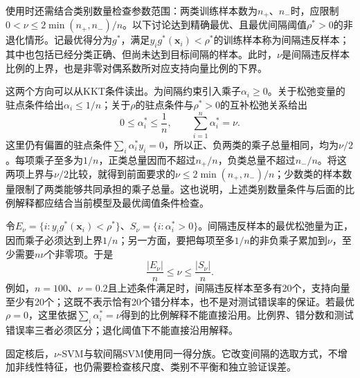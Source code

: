 使用时还需结合类别数量检查参数范围：两类训练样本数为$n_+$、$n_-$时，应限制$0<\nu\leq2\min(n_+,n_-)/n$。以下讨论达到精确最优、且最优间隔阈值$\rho^\ast>0$的非退化情形。记最优得分为$g^\ast$，满足$y_i g^\ast(\bm{x}_i)<\rho^\ast$的训练样本称为间隔违反样本；其中也包括已经分类正确、但尚未达到目标间隔的样本。此时，$\nu$是间隔违反样本比例的上界，也是非零对偶系数所对应支持向量比例的下界。

这两个方向可以从KKT条件读出。为间隔约束引入乘子$\alpha_i\geq0$。关于松弛变量的驻点条件给出$\alpha_i\leq1/n$；关于$\rho$的驻点条件与$\rho^\ast>0$的互补松弛关系给出
\[
  0\leq\alpha_i^\ast\leq\frac1n,
  \qquad \sum_{i=1}^{n}\alpha_i^\ast=\nu.
\]
这里仍有偏置的驻点条件$\sum_i\alpha_i^\ast y_i=0$，所以正、负两类的乘子总量相同，均为$\nu/2$。每项乘子至多为$1/n$，正类总量因而不超过$n_+/n$，负类总量不超过$n_-/n$。将这两项上界与$\nu/2$比较，就得到前面要求的$\nu\leq2\min(n_+,n_-)/n$；少数类的样本数量限制了两类能够共同承担的乘子总量。这也说明，上述类别数量条件与后面的比例解释都应结合当前模型及最优阈值条件检查。

令$E_\nu=\{i:y_i g^\ast(\bm{x}_i)<\rho^\ast\}$、$S_\nu=\{i:\alpha_i^\ast>0\}$。间隔违反样本的最优松弛量为正，因而乘子必须达到上界$1/n$；另一方面，要把每项至多$1/n$的非负乘子累加到$\nu$，至少需要$n\nu$个非零项。于是
\begin{equation}
  \frac{|E_\nu|}{n}\leq\nu\leq\frac{|S_\nu|}{n}.
  \label{eq:classification-nu-svm-proportions}
\end{equation}
例如，$n=100$、$\nu=0.2$且上述条件满足时，间隔违反样本至多有20个，支持向量至少有20个；这既不表示恰有20个错分样本，也不是对测试错误率的保证。若最优$\rho=0$，这里依据$\sum_i\alpha_i^\ast=\nu$得到的比例解释不能直接沿用。比例界、错分数和测试错误率三者必须区分；退化阈值下不能直接沿用解释。

固定核后，$\nu$-SVM与软间隔SVM使用同一得分族。它改变间隔的选取方式，不增加非线性特征，也仍需要检查核尺度、类别不平衡和独立验证误差。
